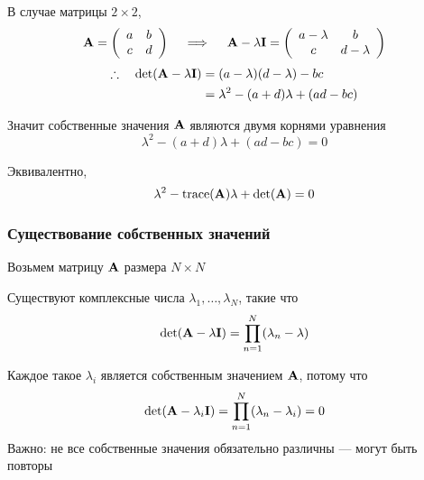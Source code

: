 \begin{frame}
    
    \vspace{2em}
    \Eg В случае матрицы $2 \times 2$,
    \begin{equation*}
        \mathbf A =
        \left(
        \begin{array}{cc}
            a & b  \\
            c & d  \\
        \end{array}
        \right)
        \quad \implies \quad
        \mathbf A - \lambda \mathbf I =
        \left(
        \begin{array}{cc}
            a - \lambda & b  \\
            c & d - \lambda 
        \end{array}
        \right)
    \end{equation*}
    \begin{align*}
        \therefore \quad
    \det(\mathbf A - \lambda \mathbf I) 
    & = (a - \lambda)(d - \lambda) - bc
    \\
    & = \lambda^2 - (a + d) \lambda + (ad - bc)
    \end{align*}
    
    Значит собственные значения $\mathbf A$ являются двумя корнями уравнения 
    \begin{equation*}
        \lambda^2 - (a + d) \lambda + (ad - bc) = 0
    \end{equation*}
    
    Эквивалентно,
    \begin{equation*}
        \lambda^2 - \operatorname{trace}(\mathbf A) \lambda + \det(\mathbf A) = 0
    \end{equation*}
    
\end{frame}


\begin{frame}

    \frametitle{Существование собственных значений}

    \vspace{2em}
    Возьмем матрицу $\mathbf A$ размера $N \times N$ 

    \vspace{0.5em}
    
    \Fact Существуют комплексные числа $\lambda_1, \ldots, \lambda_N$, такие что
    \begin{equation*}
        \det(\mathbf A - \lambda \mathbf I) = \prod_{n=1}^N (\lambda_n - \lambda)
    \end{equation*}

    Каждое такое $\lambda_i$ является собственным значением $\mathbf A$, потому что
    \begin{equation*}
        \det(\mathbf A - \lambda_i \mathbf I) 
        = \prod_{n=1}^N (\lambda_n - \lambda_i) 
        = 0
    \end{equation*}
    Важно: не все собственные значения обязательно различны --- могут быть повторы

\end{frame}

